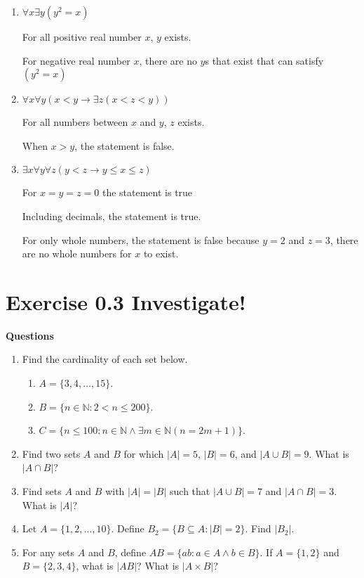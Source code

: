 \documentclass{article}
\begin{document}
\begin{enumerate}[label=\alph*.]
    \item $\forall x \exists y (y^2 = x)$
    
    For all positive real number $x$, $y$ exists.

    For negative real number $x$, there are no $y$s that exist that can satisfy $(y^{2} = x)$
    \item $\forall x \forall y (x < y \to \exists z (x < z < y))$
    
    For all numbers between $x$ and $y$, $z$ exists.

    When $x>y$, the statement is false.
    \item $\exists x \forall y \forall z (y < z \to y \leq x \leq z)$
    
    For $x=y=z=0$ the statement is true

    Including decimals, the statement is true.

    For only whole numbers, the statement is false because $y=2$ and $z=3$, there are no whole numbers for $x$ to exist.


\end{enumerate}

\section*{Exercise 0.3 Investigate!}  

\noindent\textbf{Questions} 

\begin{enumerate}
    \item Find the cardinality of each set below.
    \begin{enumerate}
        \item \( A = \{3, 4, \ldots, 15\} \).
        \item \( B = \{n \in \mathbb{N} : 2 < n \leq 200\} \).
        \item \( C = \{n \leq 100 : n \in \mathbb{N} \land \exists m \in \mathbb{N}(n = 2m + 1)\} \).
    \end{enumerate}
    
    \item Find two sets \( A \) and \( B \) for which \( |A| = 5 \), \( |B| = 6 \), and \( |A \cup B| = 9 \). What is \( |A \cap B| \)?
    
    \item Find sets \( A \) and \( B \) with \( |A| = |B| \) such that \( |A \cup B| = 7 \) and \( |A \cap B| = 3 \). What is \( |A| \)?
    
    \item Let \( A = \{1, 2, \ldots, 10\} \). Define \( B_2 = \{B \subseteq A : |B| = 2\} \). Find \( |B_2| \).
    
    \item For any sets \( A \) and \( B \), define \( AB = \{ab : a \in A \land b \in B\} \). If \( A = \{1, 2\} \) and \( B = \{2, 3, 4\} \), what is \( |AB| \)? What is \( |A \times B| \)?
\end{enumerate}
\end{document}
